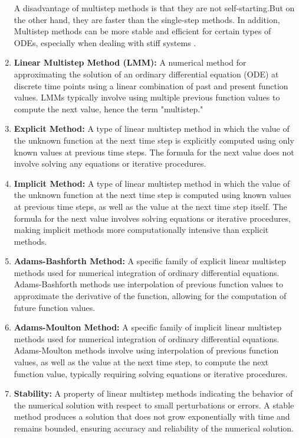 \begin{enumerate}
  A disadvantage of multistep methods is that they are not self-starting.But on the other hand, they are faster than the single-step methods. In addition, Multistep methods can be more stable and efficient for certain types of ODEs, especially when dealing with stiff systems \cite{powerseriesJFatokun}.

  \item \textbf{Linear Multistep Method (LMM):} A numerical method for approximating the solution of an ordinary differential equation (ODE) at discrete time points using a linear combination of past and present function values. LMMs typically involve using multiple previous function values to compute the next value, hence the term "multistep."
    
    \item \textbf{Explicit Method:} A type of linear multistep method in which the value of the unknown function at the next time step is explicitly computed using only known values at previous time steps. The formula for the next value does not involve solving any equations or iterative procedures.
    
    \item \textbf{Implicit Method:} A type of linear multistep method in which the value of the unknown function at the next time step is computed using known values at previous time steps, as well as the value at the next time step itself. The formula for the next value involves solving equations or iterative procedures, making implicit methods more computationally intensive than explicit methods.
    
    \item \textbf{Adams-Bashforth Method:} A specific family of explicit linear multistep methods used for numerical integration of ordinary differential equations. Adams-Bashforth methods use interpolation of previous function values to approximate the derivative of the function, allowing for the computation of future function values.
    
    \item \textbf{Adams-Moulton Method:} A specific family of implicit linear multistep methods used for numerical integration of ordinary differential equations. Adams-Moulton methods involve using interpolation of previous function values, as well as the value at the next time step, to compute the next function value, typically requiring solving equations or iterative procedures.
    
    \item \textbf{Stability:} A property of linear multistep methods indicating the behavior of the numerical solution with respect to small perturbations or errors. A stable method produces a solution that does not grow exponentially with time and remains bounded, ensuring accuracy and reliability of the numerical solution.
    

\end{enumerate}

